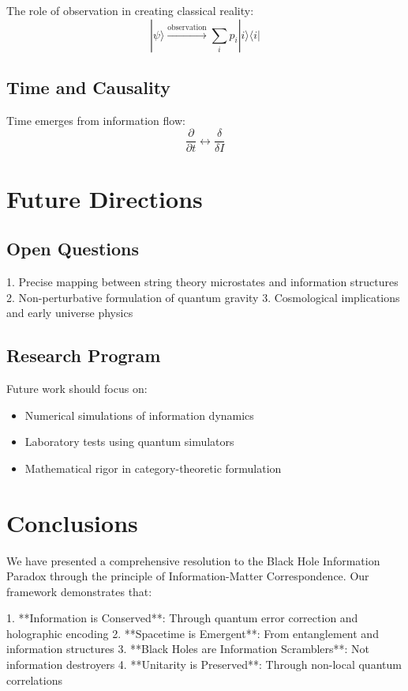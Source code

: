 \documentclass[12pt,a4paper]{article}
\begin{document}
The role of observation in creating classical reality:
\begin{equation}
|\psi\rangle \xrightarrow{\text{observation}} \sum_i p_i |i\rangle\langle i|
\end{equation}

\subsection{Time and Causality}

Time emerges from information flow:
\begin{equation}
\frac{\partial}{\partial t} \leftrightarrow \frac{\delta}{\delta I}
\end{equation}

\section{Future Directions}

\subsection{Open Questions}

1. Precise mapping between string theory microstates and information structures
2. Non-perturbative formulation of quantum gravity
3. Cosmological implications and early universe physics

\subsection{Research Program}

Future work should focus on:
\begin{itemize}
\item Numerical simulations of information dynamics
\item Laboratory tests using quantum simulators
\item Mathematical rigor in category-theoretic formulation
\end{itemize}

\section{Conclusions}

We have presented a comprehensive resolution to the Black Hole Information Paradox through the principle of Information-Matter Correspondence. Our framework demonstrates that:

1. **Information is Conserved**: Through quantum error correction and holographic encoding
2. **Spacetime is Emergent**: From entanglement and information structures
3. **Black Holes are Information Scramblers**: Not information destroyers
4. **Unitarity is Preserved**: Through non-local quantum correlations
\end{document}
